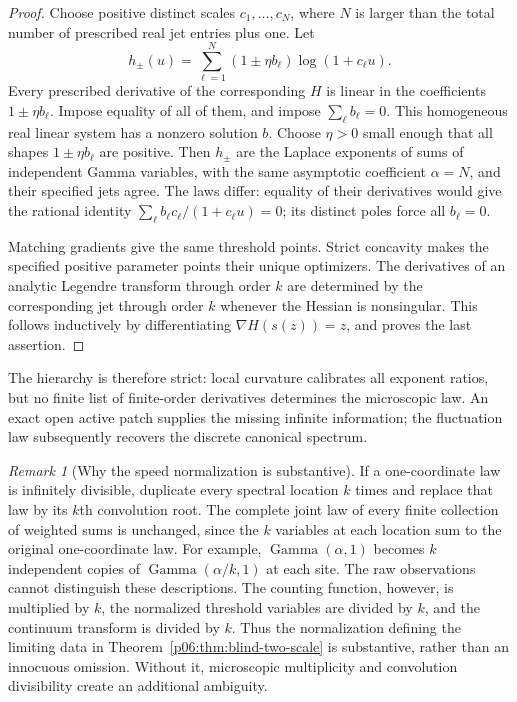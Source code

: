 \documentclass[11pt,letterpaper]{article}
\theoremstyle{definition}
\theoremstyle{remark}
\newtheorem{remark}[theorem]{Remark}
\newcommand{\1}{\mathbf 1}
\begin{document}
\begin{proof}
Choose positive distinct scales $c_1,\ldots,c_N$, where $N$ is larger
than the total number of prescribed real jet entries plus one.
Let
\[
 h_\pm(u)=\sum_{\ell=1}^N(1\pm\eta b_\ell)\log(1+c_\ell u).
\]
Every prescribed derivative of the corresponding $H$ is linear in
the coefficients $1\pm\eta b_\ell$.  Impose equality of all of them,
and impose $\sum_\ell b_\ell=0$.  This homogeneous real linear system
has a nonzero solution $b$.  Choose $\eta>0$ small enough that all
shapes $1\pm\eta b_\ell$ are positive.  Then $h_\pm$ are the Laplace
exponents of sums of independent Gamma variables, with the same
asymptotic coefficient $\alpha=N$, and their specified jets agree.
The laws differ: equality of their derivatives would give the rational
identity $\sum_\ell b_\ell c_\ell/(1+c_\ell u)=0$; its distinct poles
force all $b_\ell=0$.

Matching gradients give the same threshold points.  Strict concavity
makes the specified positive parameter points their unique optimizers.
The derivatives of an analytic Legendre transform through order $k$
are determined by the corresponding jet through order $k$ whenever
the Hessian is nonsingular.  This follows inductively by differentiating
$\nabla H(s(z))=z$, and proves the last assertion.
\end{proof}

The hierarchy is therefore strict: local curvature calibrates all
exponent ratios, but no finite list of finite-order derivatives determines
the microscopic law.  An exact open active patch supplies the missing
infinite information; the fluctuation law subsequently recovers the
discrete canonical spectrum.

\begin{remark}[Why the speed normalization is substantive]
If a one-coordinate law is infinitely divisible, duplicate every
spectral location $k$ times and replace that law by its $k$th
convolution root.  The complete joint law of every finite collection
of weighted sums is unchanged, since the $k$ variables at each location
sum to the original one-coordinate law.  For example,
$\operatorname{Gamma}(\alpha,1)$ becomes $k$ independent copies of
$\operatorname{Gamma}(\alpha/k,1)$ at each site.  The raw observations
cannot distinguish these descriptions.  The counting function,
however, is multiplied by $k$, the normalized threshold variables
are divided by $k$, and the continuum transform is divided by $k$.
Thus the normalization defining the limiting data in
Theorem~\ref{p06:thm:blind-two-scale} is substantive, rather than an
innocuous omission.  Without it, microscopic multiplicity and
convolution divisibility create an additional ambiguity.
\end{remark}
\end{document}

